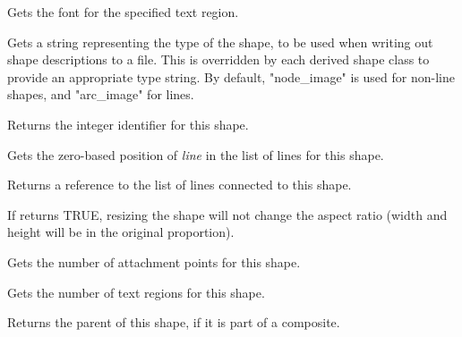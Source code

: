 
Gets the font for the specified text region.



Gets a string representing the type of the shape, to be used when
writing out shape descriptions to a file. This is overridden by
each derived shape class to provide an appropriate type string. By default,
"node\_image" is used for non-line shapes, and "arc\_image" for lines.



Returns the integer identifier for this shape.

\label{wxshapegetlineposition}


Gets the zero-based position of {\it line} in the list of lines for this shape.



Returns a reference to the list of lines connected to this shape.

\label{wxshapegetmaintainaspectratio}


If returns TRUE, resizing the shape will not change the aspect ratio
(width and height will be in the original proportion).

\label{wxshapegetnumberofattachments}


Gets the number of attachment points for this shape.



Gets the number of text regions for this shape.



Returns the parent of this shape, if it is part of a composite.

